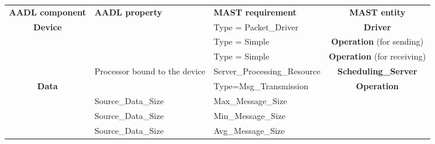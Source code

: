 \documentclass[11pt]{book}
\newcommand{\tbf}[1]{\textbf{#1}}
\begin{document}
\footnotesize
{
\begin{tabular}{|c|p{5cm}|p{5cm}|c|}
\cline{1-4}
\textbf{AADL component} & \textbf{AADL property} & \textbf{MAST requirement} & \textbf{MAST entity} \\ \cline{1-4}
\multicolumn{1}{|c|}{\multirow{4}{*}{\tbf{Device}}} &
\multicolumn{1}{|p{4cm}|}{}                             &   
\multicolumn{1}{|p{4cm}|}{Type = Packet\_Driver}                                         &   
\multicolumn{1}{|c|}{\tbf{Driver}} \\  \cline {2-4}
\multicolumn{1}{|c|}{} &
\multicolumn{1}{|p{4cm}|}{}                             &   
\multicolumn{1}{|p{4cm}|}{Type = Simple}                                         &   
\multicolumn{1}{|c|}{\tbf{Operation} (for sending)} \\  \cline {2-4}
\multicolumn{1}{|c|}{} &
\multicolumn{1}{|p{4cm}|}{}                             &   
\multicolumn{1}{|p{4cm}|}{Type = Simple}                                         &   
\multicolumn{1}{|c|}{\tbf{Operation} (for receiving)} \\  \cline {2-4}
\multicolumn{1}{|c|}{} &
\multicolumn{1}{|p{4cm}|}{Processor bound to the device}                             &   
\multicolumn{1}{|p{4cm}|}{Server\_Processing\_Resource}                                         &   
\multicolumn{1}{|c|}{\tbf{Scheduling\_Server}} \\  \cline {2-4}
\hline \hline

\multicolumn{1}{|c|}{\multirow{4}{*}{\tbf{Data}}} &
\multicolumn{1}{|p{4cm}|}{}                             &   
\multicolumn{1}{|p{4cm}|}{Type=Msg\_Transmission}                                         &   
\multicolumn{1}{|c|}{\tbf{Operation}} \\  \cline {2-3}
\multicolumn{1}{|c|}{} &
\multicolumn{1}{|p{4cm}|}{Source\_Data\_Size}                             &   
\multicolumn{1}{|p{4cm}|}{Max\_Message\_Size}                                         &   
\multicolumn{1}{|c|}{} \\  \cline {2-3}
\multicolumn{1}{|c|}{} &
\multicolumn{1}{|p{4cm}|}{Source\_Data\_Size}                             &   
\multicolumn{1}{|p{4cm}|}{Min\_Message\_Size}                                         &   
\multicolumn{1}{|c|}{} \\  \cline {2-3}
\multicolumn{1}{|c|}{} &
\multicolumn{1}{|p{4cm}|}{Source\_Data\_Size}                             &   
\multicolumn{1}{|p{4cm}|}{Avg\_Message\_Size}                                         &   
\multicolumn{1}{|c|}{} \\  \cline {2-3}
\hline \hline



\end{tabular}}
\end{document}
